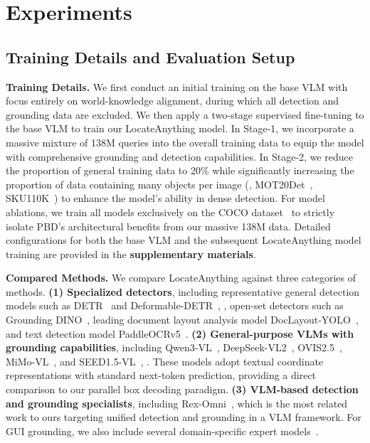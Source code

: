 \section{Experiments}
\subsection{Training Details and Evaluation Setup}
\noindent\textbf{Training Details.}
We first conduct an initial training on the base VLM with focus entirely on world-knowledge alignment, during which all detection and grounding data are excluded. We then apply a two-stage supervised fine-tuning to the base VLM to train our LocateAnything model. In Stage-1, we incorporate a massive mixture of 138M queries into the overall training data to equip the model with comprehensive grounding and detection capabilities. In Stage-2, we reduce the proportion of general training data to 20\% while significantly increasing the proportion of data containing many objects per image (\eg, MOT20Det~\citep{dendorfer2020motchallengebenchmarksinglecameramultiple}, SKU110K~\citep{goldman2019precise}) to enhance the model's ability in dense detection. For model ablations, we train all models exclusively on the COCO dataset~\citep{lin2014microsoft} to strictly isolate PBD's architectural benefits from our massive 138M data. Detailed configurations for both the base VLM and the subsequent LocateAnything model training are provided in the \textbf{supplementary materials}.



\vspace{+1mm}
\noindent\textbf{Compared Methods.} We compare LocateAnything against three categories of methods. \textbf{(1) Specialized detectors}, including representative general detection models such as DETR~\citep{carion2020end} and Deformable-DETR~\citep{zhu2021deformabledetrdeformabletransformers}, \etc, open-set detectors such as Grounding DINO~\citep{liu2023grounding}, leading document layout analysis model DocLayout-YOLO~\citep{zhao2024doclayout}, and text detection model PaddleOCRv5~\citep{cui2025paddleocr}. \textbf{(2) General-purpose VLMs with grounding capabilities}, including Qwen3-VL~\citep{bai2025qwen3vltechnicalreport}, DeepSeek-VL2~\citep{wu2024deepseekvl2mixtureofexpertsvisionlanguagemodels}, OVIS2.5~\citep{lu2025ovis25technicalreport}, MiMo-VL~\citep{coreteam2025mimovltechnicalreport}, and SEED1.5-VL~\citep{guo2025seed15vltechnicalreport}, \etc. These models adopt textual coordinate representations with standard next-token prediction, providing a direct comparison to our parallel box decoding paradigm. \textbf{(3) VLM-based detection and grounding specialists}, including Rex-Omni~\citep{jiang2025rexomni}, which is the most related work to ours targeting unified detection and grounding in a VLM framework. For GUI grounding, we also include several domain-specific expert models~\citep{liu_infigui-r1_2025, xie_scaling_2025, liu2025scalecua,yang_gta1_2025, ye_mobile-agent-v3_2025, zhou_mai-ui_2025, team_ui-venus-15_2026}.

